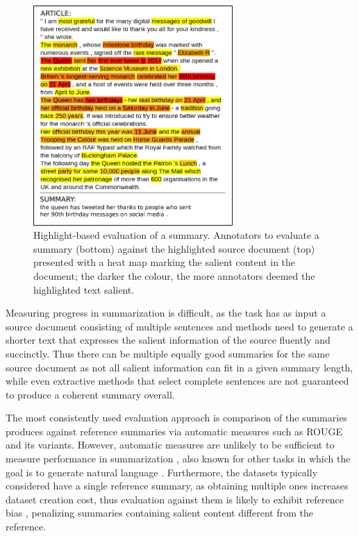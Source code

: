 \documentclass[11pt,a4paper]{article}
\begin{document}
\begin{figure}[t!]
    \centering
    \includegraphics[width=7.6cm]{heatmap_summ}
    \caption{Highlight-based evaluation of a summary. Annotators to evaluate a summary (bottom) against the highlighted source document (top) presented with a heat map marking the salient content in the document; the darker the colour, the more annotators deemed the highlighted text salient.
    }
  \label{image:heatmap}
\end{figure}

Measuring progress in summarization is difficult, as the task has as input a source document consisting of multiple sentences and methods need to generate a shorter text that expresses the salient information of the source fluently and succinctly. Thus there can be multiple equally good summaries for the same source document as not all salient information can fit in a given summary length, while even extractive methods that select complete sentences are not guaranteed to produce a coherent summary overall.

The most consistently used evaluation approach is comparison of the summaries produces against reference summaries via 
automatic measures such as ROUGE \citep{Lin2004} and its variants. However, automatic measures are unlikely to be sufficient to measure performance in summarization \citep{schluter:2017:EACLshort}, also known for other tasks in which the goal is to generate natural language \citep{novikova2017we}. Furthermore, the datasets typically considered have a single reference summary, as obtaining multiple ones increases dataset creation cost, thus evaluation against them is likely to exhibit reference bias \citep{Louis2013,fomicheva2016reference}, penalizing summaries containing salient content different from the reference. 
\end{document}
